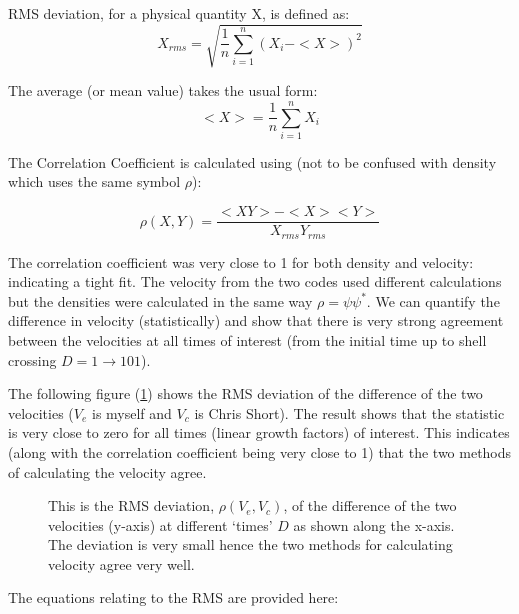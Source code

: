\noindent RMS deviation, for a physical quantity X, is defined as:
\begin{equation}
X_{rms} = \sqrt {\frac{1}{n} \sum_{i=1}^{n} (X_i - <X>)^2}
\end{equation}

\noindent The average (or mean value) takes the usual form:
\begin{equation}
<X>  = \frac{1}{n} \sum_{i=1}^{n} X_i
\end{equation}

\noindent The Correlation Coefficient is calculated using (not to be confused with density which uses the same symbol $\rho$):

\begin{equation}
\rho (X,Y) = \frac{<XY> -<X><Y>}{X_{rms} Y_{rms}}
\end{equation}

\noindent The correlation coefficient was very close to 1 for both density and velocity: indicating a tight fit. The velocity from the two codes used different calculations but the densities were calculated in the same way $\rho = \psi \psi^*$. We can quantify the difference in velocity (statistically) and show that there is very strong agreement between the velocities at all times of interest (from the initial time up to shell crossing $D=1 \rightarrow 101$).

The following figure (\ref{fig.rms_vel}) shows the RMS deviation of the difference of the two velocities ($V_e$ is myself and $V_c$ is Chris Short). The result shows that the statistic is very close to zero for all times (linear growth factors) of interest. This indicates (along with the correlation coefficient being very close to 1) that the two methods of calculating the velocity agree.


\begin{figure}[htb]
   \begin{center}
     \leavevmode %
                \epsfxsize=80mm
                 \nolinebreak

   \end{center}
\caption{This is the RMS deviation, $\rho(V_e, V_c)$, of the difference of the two velocities (y-axis) at different `times' $D$ as shown along the x-axis. The deviation is very small hence the two methods for calculating velocity agree very well.}
\label{fig.rms_vel}
\end{figure} 

The equations relating to the RMS are provided here:

